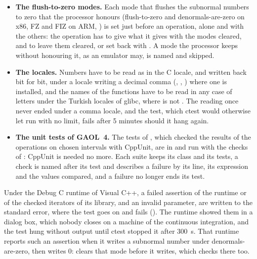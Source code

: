 \begin{itemize}
  called with the direction set upward, to nearest, downward and toward
  zero (and on x86 with the x87 and the SSE directions differing, six
  states), and has to give the results it gives when called rounding
  upward, and to leave the direction upward, or as it found it with
   ().
\item[$\bullet$] \textbf{The flush-to-zero modes.} Each mode that flushes the
  subnormal numbers to zero that the processor honours (flush-to-zero and
  denormals-are-zero on x86, FZ and FIZ on ARM, ) is set just
  before an operation, alone and with the others: the operation has to give
  what it gives with the modes cleared, and to leave them cleared, or set
  back with . A mode the processor keeps
  without honouring it, as an emulator may, is named and skipped.
\item[$\bullet$] \textbf{The locales.} Numbers have to be read as in the C
  locale, and written back bit for bit, under a locale writing a decimal
  comma (, ,
  ) where one is installed, and the names of the
  functions have to be read in any case of letters under the Turkish
  locales of glibc, where  is not . The
  reading once never ended under a comma locale, and the test, which ctest
  would otherwise let run with no limit, fails after 5 minutes should it
  hang again.
\item[$\bullet$] \textbf{The unit tests of GAOL~4.} The tests of
  , which checked the results of the operations on chosen
  intervals with CppUnit, are in  and run with the checks of
  : CppUnit is needed no more.\newinvfive{} Each suite
  keeps its class and its tests, a check is named after its test and
  describes a failure by its line, its expression and the values compared,
  and a failure no longer ends its test.
\end{itemize}

\begin{Rem}
Under the Debug C runtime of Visual C++, a failed assertion of the runtime
or of the checked iterators of its library, and an invalid parameter, are
written to the standard error, where the test goes on and fails
(). The runtime showed them in a dialog box, which
nobody closes on a machine of the continuous integration, and the test hung
without output until ctest stopped it after 300~s. That runtime reports such
an assertion when it writes a subnormal number under denormals-are-zero, then
writes 0:  clears that mode before it writes, which
 checks there too.\newinvfive
\end{Rem}

